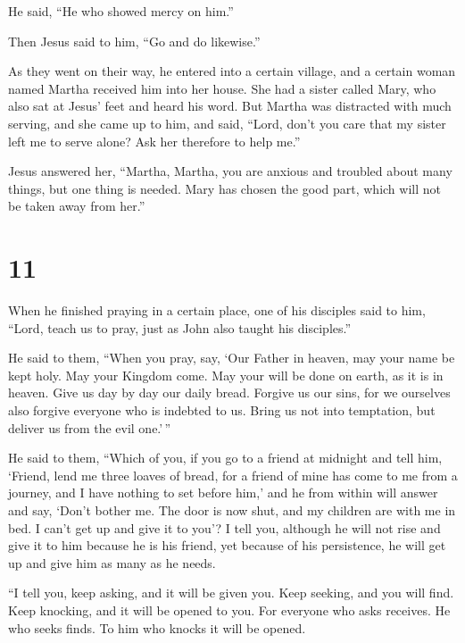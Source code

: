  He said, ``He who showed mercy on him.''

Then Jesus said to him, ``Go and do likewise.''

 As they went on their way, he entered into a certain
village, and a certain woman named Martha received him into her house.
 She had a sister called Mary, who also sat at Jesus' feet
and heard his word.  But Martha was distracted with much
serving, and she came up to him, and said, ``Lord, don't you care that
my sister left me to serve alone? Ask her therefore to help me.''

 Jesus answered her, ``Martha, Martha, you are anxious and
troubled about many things,  but one thing is needed. Mary
has chosen the good part, which will not be taken away from her.''

\hypertarget{section-10}{%
\section{11}\label{section-10}}

 When he finished praying in a certain place, one of his
disciples said to him, ``Lord, teach us to pray, just as John also
taught his disciples.''

 He said to them, ``When you pray, say, `Our Father in
heaven, may your name be kept holy. May your Kingdom come. May your will
be done on earth, as it is in heaven.  Give us day by day
our daily bread.  Forgive us our sins, for we ourselves also
forgive everyone who is indebted to us. Bring us not into temptation,
but deliver us from the evil one.'\,''

 He said to them, ``Which of you, if you go to a friend at
midnight and tell him, `Friend, lend me three loaves of bread,
 for a friend of mine has come to me from a journey, and I
have nothing to set before him,'  and he from within will
answer and say, `Don't bother me. The door is now shut, and my children
are with me in bed. I can't get up and give it to you'?  I
tell you, although he will not rise and give it to him because he is his
friend, yet because of his persistence, he will get up and give him as
many as he needs.

 ``I tell you, keep asking, and it will be given you. Keep
seeking, and you will find. Keep knocking, and it will be opened to you.
 For everyone who asks receives. He who seeks finds. To him
who knocks it will be opened.

